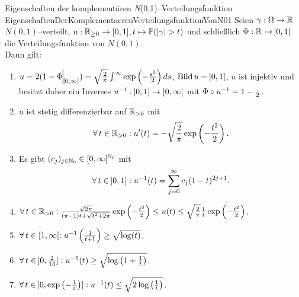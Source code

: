\begin{satz}
{Eigenschaften der komplementären \textsl{N}(0,1)--Verteilungsfunktion}
{EigenschaftenDerKomplementaerenVerteilungsfunktionVonN01}
Seien $\gamma: \Omega \rightarrow \mathbb{R}$ $N(0,1)$--verteilt,
$u:\mathbb{R}_{\ge 0} \rightarrow [0,1], t \mapsto \mathbb{P}(\left|\gamma\right| > t)$ und
schließlich
$\Phi: \mathbb{R} \rightarrow\!\  ]0,1[$ die Verteilungsfunktion von $N(0,1)$.\\
Dann gilt:
\begin{enumerate}[(1)]
\item \label{EigenschaftenDerKomplementaerenVerteilungsfunktionVonN011}
$u = 2(1 - \restrict{\Phi}{[0, \infty[}) = \sqrt{\frac 2 \pi}\int_\cdot ^\infty
\exp\left(-\frac{s^2}2 \right)ds$, $\mathop{\textrm{Bild}}\nolimits u =\!\  ]0,1]$, $u$ ist injektiv
und besitzt daher ein Inverses 
$u^{-1}:\!\ ]0,1] \rightarrow [0, \infty[$ mit $\Phi \circ u^{-1} 
= 1- \frac \cdot 2$.
\item \label{EigenschaftenDerKomplementaerenVerteilungsfunktionVonN012}
$u$ ist stetig differenzierbar auf $\mathbb{R}_{>0}$ mit 
\[\forall\,t \in \mathbb{R}_{>0}: u'(t) = 
-\sqrt{\frac 2 \pi}\exp\left(- \frac{t^2}2 \right)\text.\]
\item \label{EigenschaftenDerKomplementaerenVerteilungsfunktionVonN013}
Es gibt $(c_j)_{j \in \mathbb{N}_0}\in [0, \infty[^{\mathbb{N}_0}$ mit
\[\forall \, t \in\!\  ]0,1]: u^{-1}(t) = \sum_{j=0}^\infty
c_j(1-t)^{2j+1}\text.\]
\item \label{EigenschaftenDerKomplementaerenVerteilungsfunktionVonN014}
$\forall\, t \in \mathbb{R}_{>0}:
\frac{\sqrt{2\pi}}{(\pi-1)t + \sqrt{t^2+2\pi}}\exp\left(-\frac{t^2}2 \right)
\le u(t) \le \sqrt{\frac 2 \pi}\frac 1 t \exp\left(-\frac {t^2}2 \right)$.
\item \label{EigenschaftenDerKomplementaerenVerteilungsfunktionVonN015}
$\forall\,t\in [1,\infty[: u^{-1}\left(\frac 1 {t+1} \right)\ge \sqrt{\log(t)}$.
\item \label{EigenschaftenDerKomplementaerenVerteilungsfunktionVonN016}
$\forall\, t \in\!\  ]0, \frac 2 {13}]: 
 u ^{-1}(t) \ge \sqrt{\log\left(1+\frac 1 t\right)}$.
\item \label{EigenschaftenDerKomplementaerenVerteilungsfunktionVonN017}
$\forall\, t \in \!\ ]0,\exp\left(- \frac 1 \pi \right)]:
u^{-1}(t) \le \sqrt{2\log\left(\frac 1 t\right)}$.
\end{enumerate}
\end{satz}
